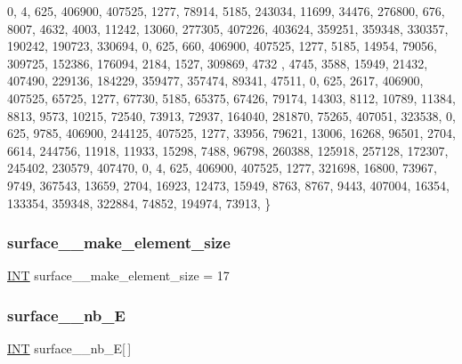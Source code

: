 \begin{DoxyCode}
    0, 4, 625, 406900, 407525, 1277, 78914, 5185, 243034, 11699, 34476, 276800, 676, 8007, 4632, 4003, 
      11242, 13060, 277305, 407226, 403624, 359251, 359348, 330357, 190242, 190723, 330694, 
    0, 625, 660, 406900, 407525, 1277, 5185, 14954, 79056, 309725, 152386, 176094, 2184, 1527, 309869, 4732
      , 4745, 3588, 15949, 21432, 407490, 229136, 184229, 359477, 357474, 89341, 47511, 
    0, 625, 2617, 406900, 407525, 65725, 1277, 67730, 5185, 65375, 67426, 79174, 14303, 8112, 10789, 11384,
       8813, 9573, 10215, 72540, 73913, 72937, 164040, 281870, 75265, 407051, 323538, 
    0, 625, 9785, 406900, 244125, 407525, 1277, 33956, 79621, 13006, 16268, 96501, 2704, 6614, 244756, 
      11918, 11933, 15298, 7488, 96798, 260388, 125918, 257128, 172307, 245402, 230579, 407470, 
    0, 4, 625, 406900, 407525, 1277, 321698, 16800, 73967, 9749, 367543, 13659, 2704, 16923, 12473, 15949, 
      8763, 8767, 9443, 407004, 16354, 133354, 359348, 322884, 74852, 194974, 73913, 
\}
\end{DoxyCode}
\mbox{\label{surface__25_8_c_a108306d74edec3e201774301ca7bbec0}} 
\subsubsection{\texorpdfstring{surface\+\_\+\_\+make\+\_\+element\+\_\+size}{surface\_25\_make\_element\_size}}
{\footnotesize\ttfamily \mbox{\hyperlink{galois_8h_a09fddde158a3a20bd2dcadb609de11dc}{I\+NT}} surface\+\_\+\_\+make\+\_\+element\+\_\+size = 17}

\mbox{\label{surface__25_8_c_ab30cd053dc8abf4fd90fcfbac1ca6951}} 
\subsubsection{\texorpdfstring{surface\+\_\+\_\+nb\+\_\+E}{surface\_25\_nb\_E}}
{\footnotesize\ttfamily \mbox{\hyperlink{galois_8h_a09fddde158a3a20bd2dcadb609de11dc}{I\+NT}} surface\+\_\+\_\+nb\+\_\+E\mbox{[}$\,$\mbox{]}}

